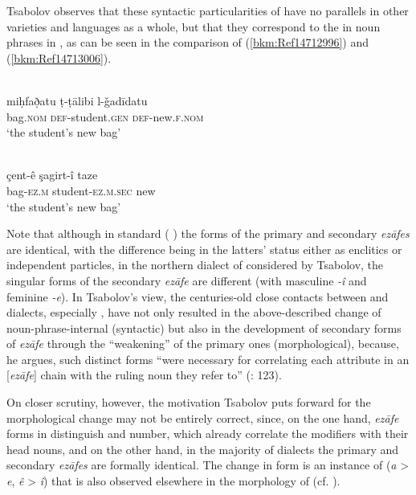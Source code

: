 \documentclass[output=paper]{langsci/langscibook}
\begin{document}

Tsabolov observes that these syntactic particularities of   have no parallels in other  varieties and  languages as a whole, but that they correspond to the  in noun phrases in , as can be seen in the comparison of (\ref{bkm:Ref14712996}) and (\ref{bkm:Ref14713006}). 

\ea\label{bkm:Ref14712996}\label{bkm:Ref14771925} \citep[123]{Tsabolov1994}\\
\gll miḥfað̣atu ṭ-ṭālibi l-ǧadīdatu\\
     bag\textsc{.nom} \textsc{def}{}-student.\textsc{gen} \textsc{def}{}-new.\textsc{f.nom} \\
\glt ‘the student’s new bag’
\z

\ea\label{bkm:Ref14713006}  \citep[123]{Tsabolov1994}\\
\gll çent-ê şagirt-î taze\\
     bag-\textsc{ez.m} student-\textsc{ez.m.sec} new\\
\glt ‘the student’s new bag’
\z

Note that although in standard  ( ) the forms of the primary and secondary \textit{ezāfes} are identical, with the difference being in the latters’ status either as enclitics or independent particles, in the northern dialect of   considered by Tsabolov, the singular forms of the secondary \textit{ezāfe} are different (with masculine \textit{{}-î} and feminine \textit{{}-e}). In Tsabolov’s view, the centuries-old close contacts between  and  dialects, especially , have not only resulted in the above-described change of noun-phrase-internal  (syntactic) but also in the development of secondary forms of \textit{ezāfe} through the “weakening” of the primary ones (morphological), because, he argues, such distinct forms “were necessary for correlating each attribute in an [\textit{ezāfe}] chain with the ruling noun they refer to” (\citeyear{Tsabolov1994}: 123). 

On closer scrutiny, however, the motivation Tsabolov puts forward for the morphological change may not be entirely correct, since, on the one hand, \textit{ezāfe} forms in   distinguish  and number, which already correlate the modifiers with their head nouns, and on the other hand, in the majority of   dialects the primary and secondary \textit{ezāfes} are formally identical. The change in form is an instance of  (\textit{a} > \textit{e}, \textit{ê} > \textit{î}) that is also observed elsewhere in the morphology of  (cf. \citealt{HaigÖpengin2018}). 
\end{document}
